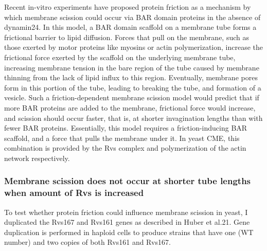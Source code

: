 	Recent in-vitro experiments have proposed protein friction as a mechanism by which membrane scission could occur via BAR domain proteins in the absence of dynamin24. In this model, a BAR domain scaffold on a membrane tube forms a frictional barrier to lipid diffusion. Forces that pull on the membrane, such as those exerted by motor proteins like myosins or actin polymerization, increase the frictional force exerted by the scaffold on the underlying membrane tube, increasing membrane tension in the bare region of the tube caused by membrane thinning from the lack of lipid influx to this region. Eventually, membrane pores form in this portion of the tube, leading to breaking the tube, and formation of a vesicle. Such a friction-dependent membrane scission model would predict that if more BAR proteins are added to the membrane, frictional force would increase, and scission should occur faster, that is, at shorter invagination lengths than with fewer BAR proteins. Essentially, this model requires a friction-inducing BAR scaffold, and a force that pulls the membrane under it. In yeast CME, this combination is provided by the Rvs complex and polymerization of the actin network respectively. 
	

		\subsubsection{Membrane scission does not occur at shorter tube lengths when amount of Rvs is increased}

	To test whether protein friction could influence membrane scission in yeast, I duplicated the Rvs167 and Rvs161 genes as described in Huber et al.21. Gene duplication is performed in haploid cells to produce strains that have one (WT number) and two copies of both Rvs161 and Rvs167. 
		
